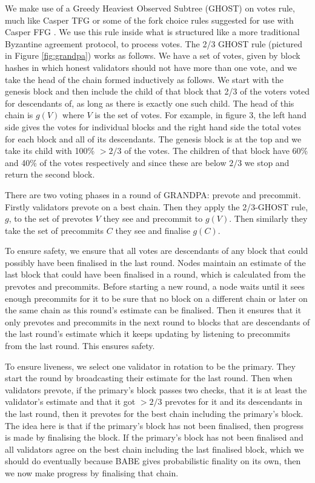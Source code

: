 We make use of a Greedy Heaviest Observed Subtree (GHOST) on votes rule, much like Casper TFG \cite{CasperTFG} or some of the fork choice rules suggested for use with Casper FFG \cite{CasperFFG}. We use this rule inside what is structured like a more traditional Byzantine agreement protocol, to process votes. The 2/3 GHOST rule (pictured in Figure \ref{fig:grandpa})  works as follows. We have a set of votes, given by block hashes in which honest validators should not have more than one vote, and we take the head of the chain formed inductively as follows. We start with the genesis block and then include the child of that block that 2/3 of the voters voted for descendants of, as long as there is exactly one such child. The head of this chain is $g(V)$ where $V$ is the set of votes. For example, in figure 3, the left hand side gives the votes for individual blocks and the right hand side the total votes for each block and all of its descendants. The genesis block is at the top and we take its child with 100\% $> 2/3$ of the votes. The children of that block have 60\% and 40\% of the votes respectively and since these are below $2/3$ we stop and return the second block.

There are two voting phases in a round of GRANDPA: prevote and precommit. Firstly validators prevote on a best chain. Then they apply the 2/3-GHOST rule, $g$, to the set of prevotes $V$ they see and precommit to $g(V)$. Then similarly they take the set of precommits $C$ they see and finalise $g(C)$.

To ensure safety, we ensure that all votes are descendants of any block that could possibly have been finalised in the last round. Nodes maintain an estimate of the last block that could have been finalised in a round, which is calculated from the prevotes and precommits. Before starting a new round, a node waits until it sees enough precommits for it to be sure that no block on a different chain or later on the same chain as this round's estimate can be finalised. Then it ensures that it only prevotes and precommits in the next round to blocks that are descendants of the last round's estimate which it keeps updating by listening to precommits from the last round. This ensures safety.

To ensure liveness, we select one validator in rotation to be the primary. They start the round by broadcasting their estimate for the last round. Then when validators prevote, if the primary's block passes two checks, that it is at least the validator's estimate and that it got $>2/3$ prevotes for it and its descendants in the last round, then it prevotes for the best chain including the primary's block. The idea here is that if the primary's block has not been finalised, then progress is made by finalising the block. If the primary's block has not been finalised and all validators agree on the best chain including the last finalised block, which we should do eventually because BABE gives probabilistic finality on its own, then we now make progress by finalising that chain.
  


